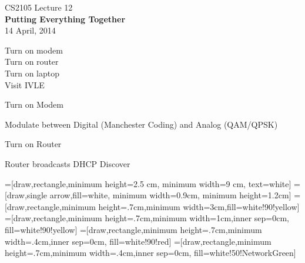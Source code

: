 \begin{cf}{
CS2105 Lecture 12\\
\large
\textbf{Putting Everything Together\\[10pt]}
\normalsize
14 April, 2014
}
\end{cf}



\begin{cf}{
}
\end{cf}

\begin{cf}{
	Turn on modem\\
	Turn on router\\
	Turn on laptop\\
	Visit IVLE\\
}
\end{cf}
	
\begin{cf}{
	Turn on Modem
}
\end{cf}

\begin{cf}{
	Modulate between Digital (Manchester Coding) and Analog (QAM/QPSK)
}
\end{cf}

\begin{cf}{
	Turn on Router
}
\end{cf}

\begin{cf}{
	Router broadcasts DHCP Discover
}
\end{cf}

=[draw,rectangle,minimum height=2.5 cm, minimum width=9 cm, text=white]
=[draw,single arrow,fill=white, minimum width=0.9cm, minimum height=1.2cm]
=[draw,rectangle,minimum height=.7cm,minimum width=3cm,fill=white!90!yellow]
=[draw,rectangle,minimum height=.7cm,minimum width=1cm,inner sep=0cm, fill=white!90!yellow]
=[draw,rectangle,minimum height=.7cm,minimum width=.4cm,inner sep=0cm, fill=white!90!red]
=[draw,rectangle,minimum height=.7cm,minimum width=.4cm,inner sep=0cm, fill=white!50!NetworkGreen]


